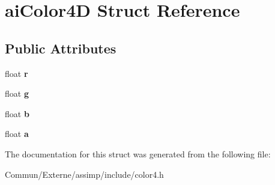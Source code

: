 \hypertarget{structai_color4_d}{}\section{ai\+Color4D Struct Reference}
\label{structai_color4_d}
\subsection*{Public Attributes}
\begin{DoxyCompactItemize}
\item 
float {\bfseries r}\hypertarget{structai_color4_d_a989c2117cfae5a4457fa65f0257e93c7}{}\label{structai_color4_d_a989c2117cfae5a4457fa65f0257e93c7}

\item 
float {\bfseries g}\hypertarget{structai_color4_d_a32e929c7db12fb6f79f74a611f6d8fe6}{}\label{structai_color4_d_a32e929c7db12fb6f79f74a611f6d8fe6}

\item 
float {\bfseries b}\hypertarget{structai_color4_d_ab64376fc730371f8952f5f98084b2430}{}\label{structai_color4_d_ab64376fc730371f8952f5f98084b2430}

\item 
float {\bfseries a}\hypertarget{structai_color4_d_a1bf4f719c14e844dcd7ce5a1c1969c89}{}\label{structai_color4_d_a1bf4f719c14e844dcd7ce5a1c1969c89}

\end{DoxyCompactItemize}


The documentation for this struct was generated from the following file\+:\begin{DoxyCompactItemize}
\item 
Commun/\+Externe/assimp/include/color4.\+h\end{DoxyCompactItemize}
